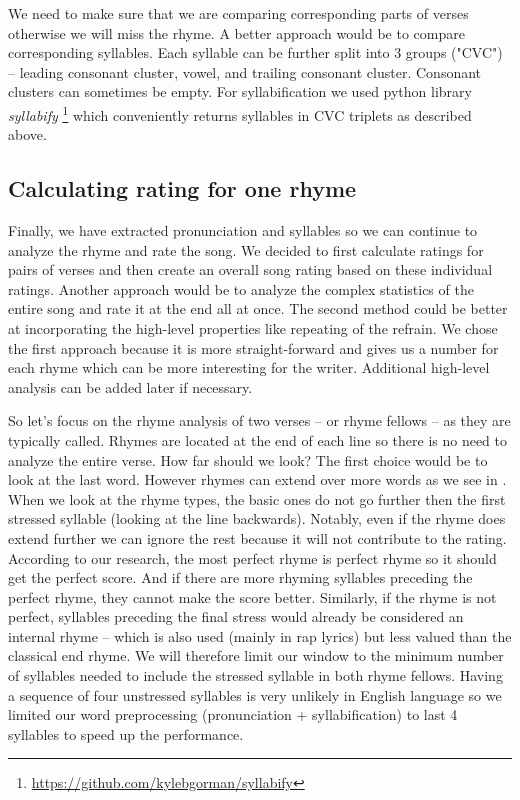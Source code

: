 We need to make sure that we are comparing corresponding parts of verses otherwise we will miss the rhyme. A better approach would be to compare corresponding syllables. Each syllable can be further split into 3 groups ("CVC") -- leading consonant cluster, vowel, and trailing consonant cluster. Consonant clusters can sometimes be empty. For syllabification we used python library \textit{syllabify} \footnote{\url{https://github.com/kylebgorman/syllabify}} which conveniently returns syllables in CVC triplets as described above.


\subsection{Calculating rating for one rhyme}
Finally, we have extracted pronunciation and syllables so we can continue to analyze the rhyme and rate the song. We decided to first calculate ratings for pairs of verses and then create an overall song rating based on these individual ratings. Another approach would be to analyze the complex statistics of the entire song and rate it at the end all at once. The second method could be better at incorporating the high-level properties like repeating of the refrain. We chose the first approach because it is more straight-forward and gives us a number for each rhyme which can be more interesting for the writer. Additional high-level analysis can be added later if necessary.

So let's focus on the rhyme analysis of two verses -- or rhyme fellows -- as they are typically called. Rhymes are located at the end of each line so there is no need to analyze the entire verse. How far should we look? The first choice would be to look at the last word. However rhymes can extend over more words as we see in . When we look at the rhyme types, the basic ones do not go further then the first stressed syllable (looking at the line backwards). Notably, even if the rhyme does extend further we can ignore the rest because it will not contribute to the rating. According to our research, the most perfect rhyme is perfect rhyme so it should get the perfect score. And if there are more rhyming syllables preceding the perfect rhyme, they cannot make the score better. Similarly, if the rhyme is not perfect, syllables preceding the final stress would already be considered an internal rhyme -- which is also used (mainly in rap lyrics) but less valued than the classical end rhyme. We will therefore limit our window to the minimum number of syllables needed to include the stressed syllable in both rhyme fellows. Having a sequence of four unstressed syllables is very unlikely in English language so we limited our word preprocessing (pronunciation + syllabification) to last 4 syllables to speed up the performance.

